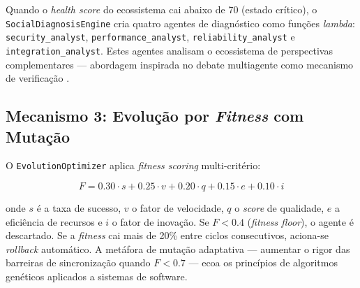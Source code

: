 \documentclass[
  article,
  12pt,
  oneside,
  a4paper,
  brazil,
  sumario=tradicional
]{abntex2}
\begin{document}
Quando o \emph{health score} do ecossistema cai abaixo de 70 (estado crítico), o \texttt{SocialDiagnosisEngine} cria quatro agentes de diagnóstico como funções \emph{lambda}: \texttt{security\_analyst}, \texttt{performance\_analyst}, \texttt{reliability\_analyst} e \texttt{integration\_\-analyst}. Estes agentes analisam o ecossistema de perspectivas complementares --- abordagem inspirada no debate multiagente como mecanismo de verificação \cite{du2023improving}.

\subsection{Mecanismo 3: Evolução por \emph{Fitness} com Mutação}

O \texttt{EvolutionOptimizer} aplica \emph{fitness scoring} multi-critério:

\begin{equation}
F = 0.30 \cdot s + 0.25 \cdot v + 0.20 \cdot q + 0.15 \cdot e + 0.10 \cdot i
\end{equation}

onde $s$ é a taxa de sucesso, $v$ o fator de velocidade, $q$ o \emph{score} de qualidade, $e$ a eficiência de recursos e $i$ o fator de inovação. Se $F < 0.4$ (\emph{fitness floor}), o agente é descartado. Se a \emph{fitness} cai mais de 20\% entre ciclos consecutivos, aciona-se \emph{rollback} automático. A metáfora de mutação adaptativa --- aumentar o rigor das barreiras de sincronização quando $F < 0.7$ --- ecoa os princípios de algoritmos genéticos aplicados a sistemas de software.
\end{document}

